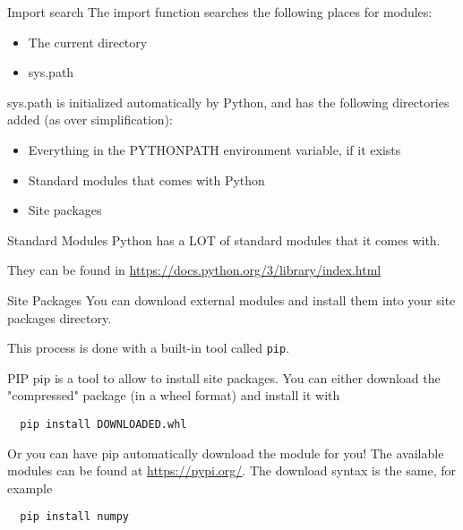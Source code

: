 \begin{frame}[containsverbatim]{Import search}
  The import function searches the following places for modules:
  \begin{itemize}
    \item The current directory
    \item sys.path
  \end{itemize}

  sys.path is initialized automatically by Python, and has the following directories added (as over simplification):
  \begin{itemize}
    \item Everything in the PYTHONPATH environment variable, if it exists
    \item Standard modules that comes with Python
    \item Site packages
  \end{itemize}
\end{frame}

\begin{frame}[containsverbatim]{Standard Modules}
  Python has a LOT of standard modules that it comes with.

  They can be found in \url{https://docs.python.org/3/library/index.html}
\end{frame}

\begin{frame}[containsverbatim]{Site Packages}
  You can download external modules and install them into your site packages directory.

  This process is done with a built-in tool called \verb|pip|.
\end{frame}

\begin{frame}[containsverbatim]{PIP}
  pip is a tool to allow to install site packages. You can either download the "compressed" package (in a wheel format) and install it with
  \begin{verbatim}
  pip install DOWNLOADED.whl
  \end{verbatim}

  Or you can have pip automatically download the module for you! The available modules can be found at \url{https://pypi.org/}. The download syntax is the same, for example
  \begin{verbatim}
  pip install numpy
  \end{verbatim}
\end{frame}

